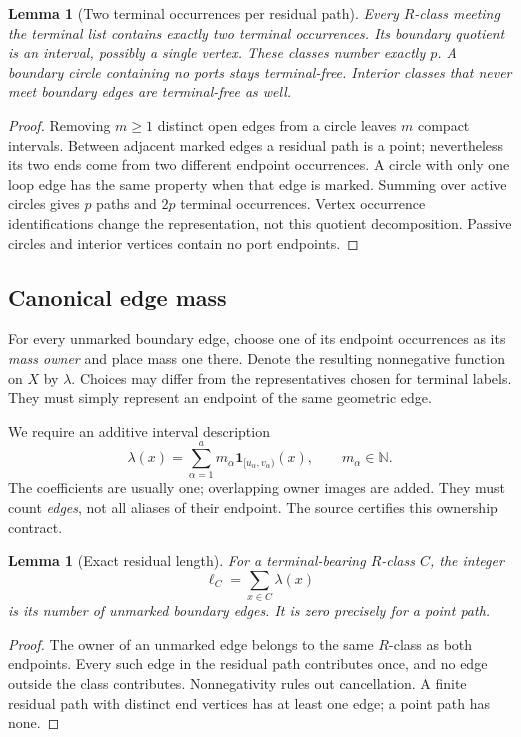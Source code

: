 \documentclass[11pt]{article}
\newtheorem{lemma}[theorem]{Lemma}
\theoremstyle{definition}\newtheorem{definition}[theorem]{Definition}\newtheorem{example}[theorem]{Example}
\theoremstyle{remark}\newtheorem{remark}[theorem]{Remark}
\newcommand{\N}{\mathbb N}
\begin{document}
\begin{lemma}[Two terminal occurrences per residual path]
\label{lem:paths}
Every $R$-class meeting the terminal list contains exactly two terminal occurrences. Its boundary quotient is an interval, possibly a single vertex. These classes number exactly $p$. A boundary circle containing no ports stays terminal-free. Interior classes that never meet boundary edges are terminal-free as well.
\end{lemma}
\begin{proof}
Removing $m\ge1$ distinct open edges from a circle leaves $m$ compact intervals. Between adjacent marked edges a residual path is a point; nevertheless its two ends come from two different endpoint occurrences. A circle with only one loop edge has the same property when that edge is marked. Summing over active circles gives $p$ paths and $2p$ terminal occurrences. Vertex occurrence identifications change the representation, not this quotient decomposition. Passive circles and interior vertices contain no port endpoints.
\end{proof}

\subsection{Canonical edge mass}
For every unmarked boundary edge, choose one of its endpoint occurrences as its \emph{mass owner} and place mass one there. Denote the resulting nonnegative function on $X$ by $\lambda$. Choices may differ from the representatives chosen for terminal labels. They must simply represent an endpoint of the same geometric edge.

We require an additive interval description
\begin{equation}\label{eq:mass}
       \lambda(x)=\sum_{\alpha=1}^{a}m_\alpha
                        \mathbf1_{[u_\alpha,v_\alpha)}(x),
       \qquad m_\alpha\in\N.
\end{equation}
The coefficients are usually one; overlapping owner images are added. They must count \emph{edges}, not all aliases of their endpoint. The source certifies this ownership contract.

\begin{lemma}[Exact residual length]
\label{lem:length}
For a terminal-bearing $R$-class $C$, the integer
\[
                            \ell_C=\sum_{x\in C}\lambda(x)
\]
is its number of unmarked boundary edges. It is zero precisely for a point path.
\end{lemma}
\begin{proof}
The owner of an unmarked edge belongs to the same $R$-class as both endpoints. Every such edge in the residual path contributes once, and no edge outside the class contributes. Nonnegativity rules out cancellation. A finite residual path with distinct end vertices has at least one edge; a point path has none.
\end{proof}
\end{document}
